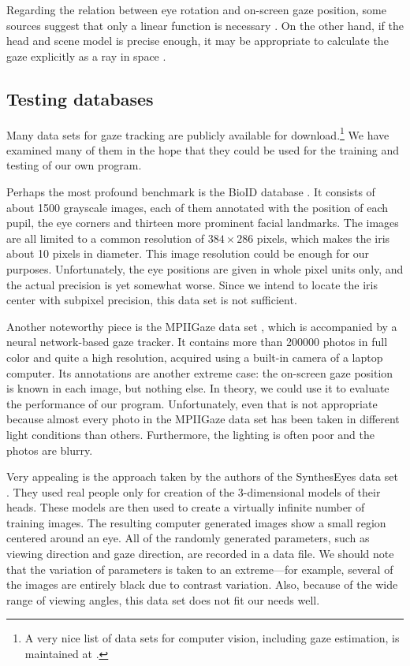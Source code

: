 Regarding the relation between eye rotation and on-screen gaze position, some sources suggest that only a linear function is necessary \cite{zhu12}.
On the other hand, if the head and scene model is precise enough, it may be appropriate to calculate the gaze explicitly as a ray in space \cite{wang16}.

\subsection{Testing databases}

Many data sets for gaze tracking are publicly available for download.\footnote{
A very nice list of data sets for computer vision, including gaze estimation, is maintained at .
}
We have examined many of them in the hope that they could be used for the training and testing of our own program.

Perhaps the most profound benchmark is the BioID database \cite{bioid}.
It consists of about 1500 grayscale images, each of them annotated with the position of each pupil, the eye corners and thirteen more prominent facial landmarks.
The images are all limited to a common resolution of $384\times286$ pixels, which makes the iris about 10 pixels in diameter.
This image resolution could be enough for our purposes.
Unfortunately, the eye positions are given in whole pixel units only, and the actual precision is yet somewhat worse.
Since we intend to locate the iris center with subpixel precision, this data set is not sufficient.

Another noteworthy piece is the MPIIGaze data set \cite{mpiigaze}, which is accompanied by a neural network-based gaze tracker.
It contains more than \num{200000} photos in full color and quite a high resolution, acquired using a built-in camera of a laptop computer.
Its annotations are another extreme case: the on-screen gaze position is known in each image, but nothing else.
In theory, we could use it to evaluate the performance of our program.
Unfortunately, even that is not appropriate because almost every photo in the MPIIGaze data set has been taken in different light conditions than others.
Furthermore, the lighting is often poor and the photos are blurry.

Very appealing is the approach taken by the authors of the SynthesEyes data set \cite{syntheseyes}.
They used real people only for creation of the 3-dimensional models of their heads.
These models are then used to create a virtually infinite number of training images.
The resulting computer generated images show a small region centered around an eye.
All of the randomly generated parameters, such as viewing direction and gaze direction, are recorded in a data file.
We should note that the variation of parameters is taken to an extreme---for example, several of the images are entirely black due to contrast variation.
Also, because of the wide range of viewing angles, this data set does not fit our needs well.

